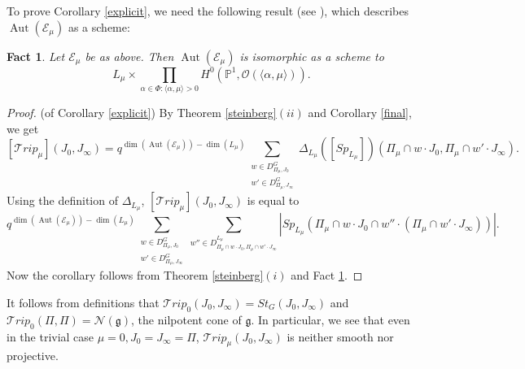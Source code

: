 \documentclass{amsart}
\newcommand{\cE}{\mathcal{E}}
\theoremstyle{plain}
\newtheorem{fact}{Fact}[section]
\theoremstyle{definition}
\theoremstyle{remark}
\DeclareMathOperator{\aut}{Aut}
\begin{document}
To prove Corollary \ref{explicit}, we need the following result (see \cite[Proposition 5.2]{Ra}), which describes $\aut(\cE_{\mu})$ as a scheme:
\begin{fact}\label{aut of emu}
Let $\cE_{\mu}$ be as above. Then $\aut(\cE_{\mu})$ is isomorphic as a scheme to
\[
L_{\mu}\times \prod_{\alpha\in\Phi:\langle\alpha,\mu\rangle>0}H^{0}(\mathbb{P}^{1},\mathcal{O}(\langle\alpha,\mu\rangle)).
\]
\end{fact}
\begin{proof}(of Corollary \ref{explicit})
By Theorem \ref{steinberg}$(ii)$ and Corollary \ref{final}, we get
\begin{equation}\label{last page}
[\mathcal{T}rip_\mu](J_{0},J_{\infty})
=
q^{\dim(\aut(\cE_{\mu}))-\dim(L_{\mu})}\displaystyle\sum_{\substack{w\in D^{G}_{\Pi_{\mu},J_{0}}
\\
w'\in D^{G}_{\Pi_{\mu},J_{\infty}}}}\Delta_{L_{\mu}}([Sp_{L_{\mu}}])(\Pi_{\mu}\cap w\cdot J_{0},\Pi_{\mu}\cap w'\cdot J_{\infty}).
\end{equation}
Using the definition of $\Delta_{L_{\mu}}$, $[\mathcal{T}rip_\mu](J_{0},J_{\infty})$ is equal to
\[
q^{\dim(\aut(\cE_{\mu}))-\dim(L_{\mu})}\displaystyle\sum_{\substack{w\in D^{G}_{\Pi_{\mu},J_{0}}
\\
w'\in D^{G}_{\Pi_{\mu},J_{\infty}}}}
\sum_{w''\in D^{L_{\mu}}_{\Pi_{\mu}\cap w\cdot J_{0},\Pi_{\mu}\cap w'\cdot J_{\infty}}}
|Sp_{L_{\mu}}(\Pi_{\mu}\cap w\cdot J_{0}\cap w''\cdot(\Pi_{\mu}\cap w'\cdot J_{\infty}))|.
\]
Now the corollary follows from Theorem \ref{steinberg}$(i)$ and Fact \ref{aut of emu}.
\end{proof}
It follows from definitions that $\mathcal{T}rip_0(J_0,J_\infty)=St_G(J_0, J_\infty)$ and $\mathcal{T}rip_0(\Pi,\Pi)=\mathcal{N}(\mathfrak{g})$, the nilpotent cone of $\mathfrak{g}$. In particular, we see that even in the trivial case $\mu=0, J_{0}=J_{\infty}=\Pi$, $\mathcal{T}rip_{\mu}(J_{0},J_{\infty})$ is neither smooth nor projective. 
\end{document}
